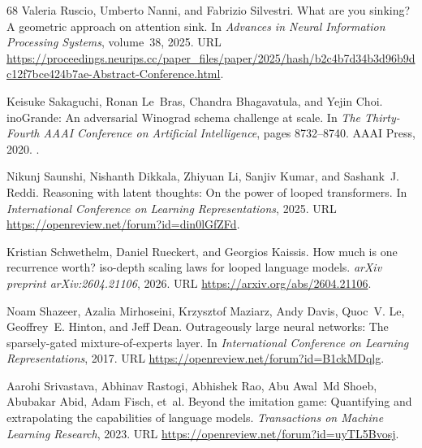 \documentclass[]{bytedance_seed}
\theoremstyle{definition}
\theoremstyle{remark}
\begin{document}
\begin{thebibliography}{68}
Valeria Ruscio, Umberto Nanni, and Fabrizio Silvestri.
\newblock What are you sinking? {A} geometric approach on attention sink.
\newblock In \emph{Advances in Neural Information Processing Systems},
  volume~38, 2025.
\newblock URL
  \url{https://proceedings.neurips.cc/paper_files/paper/2025/hash/b2c4b7d34b3d96b9dc12f7bce424b7ae-Abstract-Conference.html}.

Keisuke Sakaguchi, Ronan Le~Bras, Chandra Bhagavatula, and Yejin Choi.
ino{G}rande: An adversarial {W}inograd schema challenge at scale.
\newblock In \emph{The Thirty-Fourth AAAI Conference on Artificial
  Intelligence}, pages 8732--8740. {AAAI} Press, 2020.
\newblock {}.

Nikunj Saunshi, Nishanth Dikkala, Zhiyuan Li, Sanjiv Kumar, and Sashank~J.
  Reddi.
\newblock Reasoning with latent thoughts: On the power of looped transformers.
\newblock In \emph{International Conference on Learning Representations}, 2025.
\newblock URL \url{https://openreview.net/forum?id=din0lGfZFd}.

Kristian Schwethelm, Daniel Rueckert, and Georgios Kaissis.
\newblock How much is one recurrence worth? iso-depth scaling laws for looped
  language models.
\newblock \emph{arXiv preprint arXiv:2604.21106}, 2026.
\newblock URL \url{https://arxiv.org/abs/2604.21106}.

Noam Shazeer, Azalia Mirhoseini, Krzysztof Maziarz, Andy Davis, Quoc~V. Le,
  Geoffrey~E. Hinton, and Jeff Dean.
\newblock Outrageously large neural networks: The sparsely-gated
  mixture-of-experts layer.
\newblock In \emph{International Conference on Learning Representations}, 2017.
\newblock URL \url{https://openreview.net/forum?id=B1ckMDqlg}.

Aarohi Srivastava, Abhinav Rastogi, Abhishek Rao, Abu Awal~Md Shoeb, Abubakar
  Abid, Adam Fisch, et~al.
\newblock Beyond the imitation game: Quantifying and extrapolating the
  capabilities of language models.
\newblock \emph{Transactions on Machine Learning Research}, 2023.
\newblock URL \url{https://openreview.net/forum?id=uyTL5Bvosj}.


\end{thebibliography}
\end{document}
